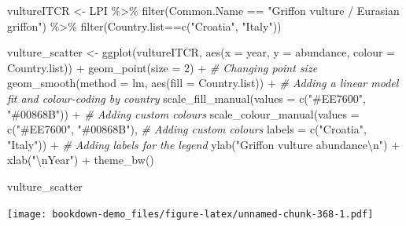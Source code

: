 \documentclass[
]{book}
\newenvironment{Shaded}{\begin{snugshade}}{\end{snugshade}}
\newcommand{\AttributeTok}[1]{\textcolor[rgb]{0.77,0.63,0.00}{#1}}
\newcommand{\CommentTok}[1]{\textcolor[rgb]{0.56,0.35,0.01}{\textit{#1}}}
\newcommand{\DecValTok}[1]{\textcolor[rgb]{0.00,0.00,0.81}{#1}}
\newcommand{\FunctionTok}[1]{\textcolor[rgb]{0.00,0.00,0.00}{#1}}
\newcommand{\NormalTok}[1]{#1}
\newcommand{\OtherTok}[1]{\textcolor[rgb]{0.56,0.35,0.01}{#1}}
\newcommand{\SpecialCharTok}[1]{\textcolor[rgb]{0.00,0.00,0.00}{#1}}
\newcommand{\StringTok}[1]{\textcolor[rgb]{0.31,0.60,0.02}{#1}}
\begin{document}
\begin{Shaded}
\begin{Highlighting}[]
\NormalTok{vultureITCR }\OtherTok{\textless{}{-}}\NormalTok{ LPI }\SpecialCharTok{\%\textgreater{}\%} 
  \FunctionTok{filter}\NormalTok{(Common.Name }\SpecialCharTok{==} \StringTok{"Griffon vulture / Eurasian griffon"}\NormalTok{) }\SpecialCharTok{\%\textgreater{}\%}
  \FunctionTok{filter}\NormalTok{(Country.list}\SpecialCharTok{==}\FunctionTok{c}\NormalTok{(}\StringTok{"Croatia"}\NormalTok{, }\StringTok{"Italy"}\NormalTok{))}

\NormalTok{vulture\_scatter }\OtherTok{\textless{}{-}} \FunctionTok{ggplot}\NormalTok{(vultureITCR, }\FunctionTok{aes}\NormalTok{(}\AttributeTok{x =}\NormalTok{ year, }\AttributeTok{y =}\NormalTok{ abundance, }\AttributeTok{colour =}\NormalTok{ Country.list)) }\SpecialCharTok{+}
    \FunctionTok{geom\_point}\NormalTok{(}\AttributeTok{size =} \DecValTok{2}\NormalTok{) }\SpecialCharTok{+}  
  \CommentTok{\# Changing point size}
    \FunctionTok{geom\_smooth}\NormalTok{(}\AttributeTok{method =}\NormalTok{ lm, }\FunctionTok{aes}\NormalTok{(}\AttributeTok{fill =}\NormalTok{ Country.list)) }\SpecialCharTok{+} 
  \CommentTok{\# Adding a linear model fit and colour{-}coding by country}
    \FunctionTok{scale\_fill\_manual}\NormalTok{(}\AttributeTok{values =} \FunctionTok{c}\NormalTok{(}\StringTok{"\#EE7600"}\NormalTok{, }\StringTok{"\#00868B"}\NormalTok{)) }\SpecialCharTok{+}               
  \CommentTok{\# Adding custom colours}
    \FunctionTok{scale\_colour\_manual}\NormalTok{(}\AttributeTok{values =} \FunctionTok{c}\NormalTok{(}\StringTok{"\#EE7600"}\NormalTok{, }\StringTok{"\#00868B"}\NormalTok{),               }
                        \CommentTok{\# Adding custom colours}
                        \AttributeTok{labels =} \FunctionTok{c}\NormalTok{(}\StringTok{"Croatia"}\NormalTok{, }\StringTok{"Italy"}\NormalTok{)) }\SpecialCharTok{+}               
  \CommentTok{\# Adding labels for the legend}
    \FunctionTok{ylab}\NormalTok{(}\StringTok{"Griffon vulture abundance}\SpecialCharTok{\textbackslash{}n}\StringTok{"}\NormalTok{) }\SpecialCharTok{+}                             
    \FunctionTok{xlab}\NormalTok{(}\StringTok{"}\SpecialCharTok{\textbackslash{}n}\StringTok{Year"}\NormalTok{)  }\SpecialCharTok{+}
        \FunctionTok{theme\_bw}\NormalTok{() }

\NormalTok{vulture\_scatter}
\end{Highlighting}
\end{Shaded}

\texttt{[image: bookdown-demo\_files/figure-latex/unnamed-chunk-368-1.pdf]}
\end{document}
